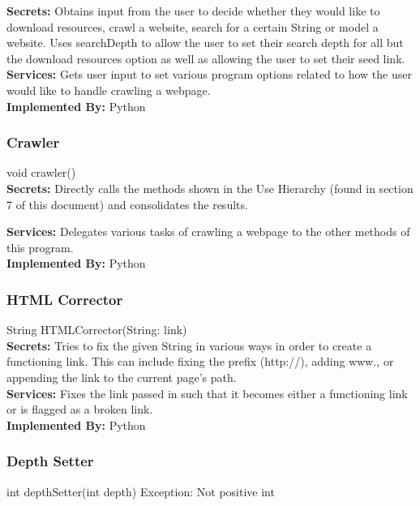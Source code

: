 \documentclass[titlepage]{article}
\begin{document}
\textbf{Secrets:}
Obtains input from the user to decide whether they would like to download resources, crawl a website, search for a certain String or model a website. Uses searchDepth to allow the user to set their search depth for all but the download resources option as well as allowing the user to set their seed link.\\

\textbf{Services:}
Gets user input to set various program options related to how the user would like to handle crawling a webpage.\\

\textbf{Implemented By:}
Python

\subsubsection{Crawler}
void crawler()\\

\textbf{Secrets:}
Directly calls the methods shown in the Use Hierarchy (found in section 7 of this document) and consolidates the results.

\textbf{Services:}
Delegates various tasks of crawling a webpage to the other methods of this program.\\

\textbf{Implemented By:}
Python

\subsubsection{HTML Corrector}
String HTMLCorrector(String: link)\\

\textbf{Secrets:}
Tries to fix the given String in various ways in order to create a functioning link. This can include fixing the prefix (http://), adding www., or appending the link to the current page's path.\\

\textbf{Services:}
Fixes the link passed in such that it becomes either a functioning link or is flagged as a broken link.\\

\textbf{Implemented By:}
Python

\subsubsection{Depth Setter}
int depthSetter(int depth) Exception: Not positive int\\
\end{document}
